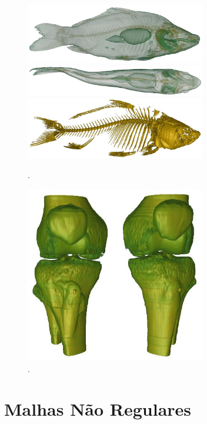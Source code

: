 \begin{figure}[H]
	\centering
	\subfigure
	{
		\includegraphics[width=0.7\textwidth]{images/r_m_carp}
	}
	\subfigure
	{
		\includegraphics[width=0.7\textwidth]{images/r_m_carp_up}
	}
	\subfigure
	{
		\includegraphics[width=0.7\textwidth]{images/r_m_carp_exo}
	}
	\caption{.}
\end{figure}

\begin{figure}[H]
	\centering
	\includegraphics[width=0.7\textwidth]{images/r_m_knee}
	\caption{.}
\end{figure}

\section{Malhas Não Regulares}
\label{sec:result.irreg}

